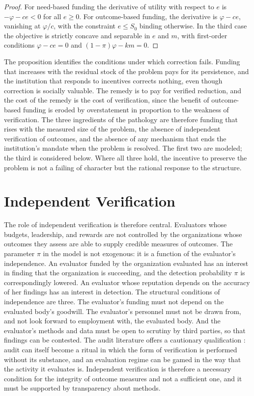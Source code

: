 \documentclass[11pt]{report}
\theoremstyle{definition}
\theoremstyle{remark}
\begin{document}
\begin{proof}
For need-based funding the derivative of utility with respect to $e$ is $-\varphi-ce<0$ for all $e\ge0$. For outcome-based funding, the derivative is $\varphi-ce$, vanishing at $\varphi/c$, with the constraint $e\le S_0$ binding otherwise. In the third case the objective is strictly concave and separable in $e$ and $m$, with first-order conditions $\varphi-ce=0$ and $(1-\pi)\varphi-km=0$.
\end{proof}

The proposition identifies the conditions under which correction fails. Funding that increases with the residual stock of the problem pays for its persistence, and the institution that responds to incentives corrects nothing, even though correction is socially valuable. The remedy is to pay for verified reduction, and the cost of the remedy is the cost of verification, since the benefit of outcome-based funding is eroded by overstatement in proportion to the weakness of verification. The three ingredients of the pathology are therefore funding that rises with the measured size of the problem, the absence of independent verification of outcomes, and the absence of any mechanism that ends the institution's mandate when the problem is resolved. The first two are modeled; the third is considered below. Where all three hold, the incentive to preserve the problem is not a failing of character but the rational response to the structure.

\section{Independent Verification}

The role of independent verification is therefore central. Evaluators whose budgets, leadership, and rewards are not controlled by the organizations whose outcomes they assess are able to supply credible measures of outcomes. The parameter $\pi$ in the model is not exogenous: it is a function of the evaluator's independence. An evaluator funded by the organization evaluated has an interest in finding that the organization is succeeding, and the detection probability $\pi$ is correspondingly lowered. An evaluator whose reputation depends on the accuracy of her findings has an interest in detection. The structural conditions of independence are three. The evaluator's funding must not depend on the evaluated body's goodwill. The evaluator's personnel must not be drawn from, and not look forward to employment with, the evaluated body. And the evaluator's methods and data must be open to scrutiny by third parties, so that findings can be contested. The audit literature offers a cautionary qualification \cite{power}: audit can itself become a ritual in which the form of verification is performed without its substance, and an evaluation regime can be gamed in the way that the activity it evaluates is. Independent verification is therefore a necessary condition for the integrity of outcome measures and not a sufficient one, and it must be supported by transparency about methods.
\end{document}

